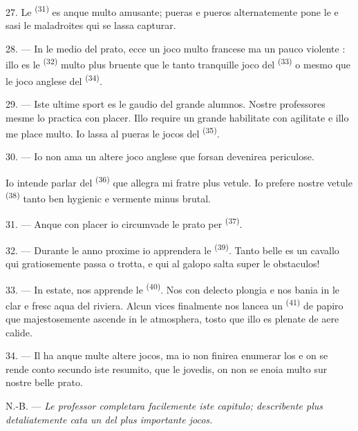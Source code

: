 \VUsaut{5.0mm}
\VUsaut{3.4mm}

27. Le  \textsuperscript{(31)} es anque multo amusante;
pueras e pueros alternatemente pone le  e sasi le
maladroites qui se lassa capturar.

28. --- In le medio del prato, ecce un joco multo francese ma un pauco violente
: illo es le  \textsuperscript{(32)} multo plus bruente que le tanto
tranquille joco del  \textsuperscript{(33)} o mesmo que le
joco anglese del  \textsuperscript{(34)}.

29. --- Iste ultime sport es le gaudio del grande alumnos. Nostre professores
mesme lo practica con placer. Illo require un grande habilitate con agilitate e
illo me place multo. Io lassa al pueras le jocos del 
\textsuperscript{(35)}.

30. --- Io non ama un altere joco anglese que forsan devenirea periculose.

Io intende parlar del  \textsuperscript{(36)} que allegra mi
fratre plus vetule. Io prefere nostre vetule 
\textsuperscript{(38)} tanto ben hygienic e vermente minus brutal.

\VUsaut{4.6mm}
\VUsaut{3.0mm}

31. --- Anque con placer io circumvade le prato per 
\textsuperscript{(37)}.

32. --- Durante le anno proxime io apprendera le 
\textsuperscript{(39)}. Tanto belle es un cavallo qui gratiosemente passa o
trotta, e qui al galopo salta super le obstaculos!

33. --- In estate, nos apprende le 
\textsuperscript{(40)}. Nos con delecto plongia e nos bania in le clar e fresc
aqua del riviera. Alcun vices finalmente nos lancea un 
\textsuperscript{(41)} de papiro que majestosemente ascende in le atmosphera,
tosto que illo es plenate de aere calide.

34. --- Il ha anque multe altere jocos, ma io non finirea enumerar los e on se
rende conto secundo iste resumito, que le jovedis, on non se enoia multo sur
nostre belle prato.

N.-B. --- \textit{Le professor completara facilemente iste capitulo; describente
plus detaliatemente cata un del plus importante jocos.}
\VUsaut{6.0mm}
\VUfilet{22mm}
